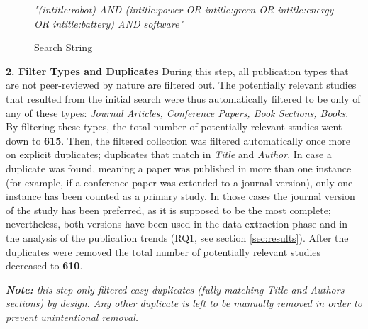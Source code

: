 \begin{figure}
    \centering
    \textit{"(intitle:robot) AND (intitle:power OR intitle:green OR intitle:energy OR intitle:battery) AND software"}
    \caption{Search String}
    \label{fig:search_string}
\end{figure}

\noindent\textbf{2. Filter Types and Duplicates}
During this step, all publication types that are not peer-reviewed by nature are filtered out. 
The potentially relevant studies that resulted from the initial search were thus automatically filtered to be only of any of these types: \textit{Journal Articles, Conference Papers, Book Sections, Books}.
By filtering these types, the total number of potentially relevant studies went down to \textbf{615}. 
Then, the filtered collection was filtered automatically once more on explicit duplicates; duplicates that match in \textit{Title} and \textit{Author}.
In case a duplicate was found, meaning a paper was published in more than one instance (for example, if a conference paper was extended to a journal version), only one instance has been counted as a primary study. 
In those cases the journal version of the study has been preferred, as it is supposed to be the most complete; nevertheless, both versions have been used in the data extraction phase and in the analysis of the publication trends (RQ1, see section \ref{sec:results}).
After the duplicates were removed the total number of potentially relevant studies decreased to \textbf{610}.

\vspace{1mm}

\textit{\textbf{Note:} this step only filtered easy duplicates (fully matching Title and Authors sections) by design. Any other duplicate is left to be manually removed in order to prevent unintentional removal.}

\vspace{5mm}

